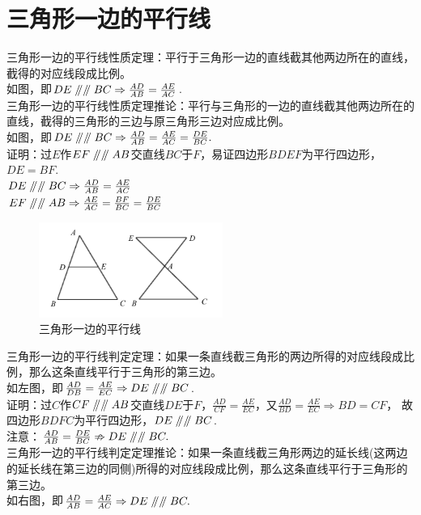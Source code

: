 \documentclass{ecnuthesis}
\newcommand\px{\mathrel{/\mkern-5mu/}}  %
\begin{document}
\section{三角形一边的平行线}
\begin{knowledge}
    三角形一边的平行线性质定理：平行于三角形一边的直线截其他两边所在的直线，截得的对应线段成比例。\\
    如图，即$DE \px \px BC \Rightarrow \frac{AD}{AB}=\frac{AE}{AC}$. \\
    三角形一边的平行线性质定理推论：平行与三角形的一边的直线截其他两边所在的直线，截得的三角形的三边与原三角形三边对应成比例。\\
    如图，即$DE\px\px BC \Rightarrow \frac{AD}{AB}=\frac{AE}{AC}=\frac{DE}{BC}.$ \\
    证明：过$E$作$EF\px\px AB$交直线$BC$于$F$，易证四边形$BDEF$为平行四边形，$DE=BF$.\\
    $DE \px \px BC \Rightarrow \frac{AD}{AB}=\frac{AE}{AC}$ \\
    $EF \px \px AB \Rightarrow \frac{AE}{AC}=\frac{BF}{BC}=\frac{DE}{BC}$
\end{knowledge}
\begin{figure}[H]
\centering
\includegraphics[width=6cm]{picture/804.png}
\caption{三角形一边的平行线}
\end{figure}
\begin{knowledge}
    三角形一边的平行线判定定理：如果一条直线截三角形的两边所得的对应线段成比例，那么这条直线平行于三角形的第三边。\\
    如左图，即$\frac{AD}{DB}=\frac{AE}{EC}\Rightarrow DE \px \px BC$. \\
    证明：过$C$作$CF \px \px AB$交直线$DE$于$F$，$\frac{AD}{CF}=\frac{AE}{EC}$，又$\frac{AD}{BD}=\frac{AE}{EC}\Rightarrow BD=CF$，
    故四边形$BDFC$为平行四边形，$DE\px \px BC$. \\
    注意：$\frac{AD}{AB}=\frac{DE}{BC} \nRightarrow DE\px \px BC.$ \\
    三角形一边的平行线判定定理推论：如果一条直线截三角形两边的延长线(这两边的延长线在第三边的同侧)所得的对应线段成比例，那么这条直线平行于三角形的第三边。\\
    如右图，即$\frac{AD}{AB}=\frac{AE}{AC}\Rightarrow DE \px \px BC.$
\end{knowledge}
\end{document}
